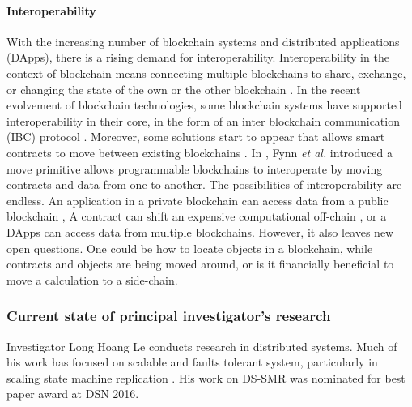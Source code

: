 \paragraph*{Interoperability} With the increasing number of blockchain systems
and distributed applications (DApps), there is a rising demand for
interoperability. Interoperability in the context of blockchain means connecting
multiple blockchains to share, exchange, or changing the state of the own or the
other blockchain \cite{buterin2016chain}. In the recent evolvement of blockchain
technologies, some blockchain systems have supported interoperability in their
core, in the form of an inter blockchain communication (IBC) protocol
\cite{kwon2016cosmos, thomas2015protocol, kokoris2018omniledger,
al2017chainspace}. Moreover, some solutions start to appear that allows smart
contracts to move between existing blockchains \cite{fynn2020move,
back2014enabling, herlihy2018atomic}. In \cite{fynn2020move}, Fynn \emph{et al.}
introduced a move primitive \cite{fynn2020move} allows programmable blockchains
to interoperate by moving contracts and data from one to another. The
possibilities of interoperability are endless. An application in a private
blockchain can access data from a public blockchain \cite{prusty2018blockchain},
A contract can shift an expensive computational off-chain
\cite{teutsch2019scalable, network2018cheap}, or a DApps can access data from
multiple blockchains. However, it also leaves new open questions. One could be
how to locate objects in a blockchain, while contracts and objects are being
moved around, or is it financially beneficial to move a calculation to a
side-chain.

\subsubsection{Current state of principal investigator's research}

Investigator Long Hoang Le conducts research in distributed systems. Much of his
work has focused on scalable and faults tolerant system, particularly in scaling
state machine replication \cite{le2016dssmr, le2019dynastar, bezerra2016strong}.
His work on DS-SMR \cite{le2016dssmr} was nominated for best paper award at DSN
2016. 


